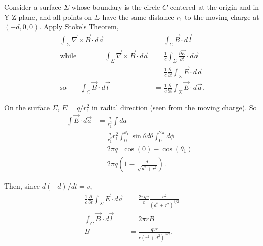 \documentclass[makesolutionspdf]{esg8022pset}
\begin{document}
\begin{solution}
\begin{enumerate}[(a)]
      Consider a surface $\Sigma$ whose boundary is the circle $C$ centered
      at the origin and in Y-Z plane, and all points on $\Sigma$ have the
      same distance $r_1$ to the moving charge at $(-d,0,0)$.  Apply Stoke's
      Theorem,
      \begin{align}
        \int_{\Sigma} \vec{\nabla}\times\vec{B}\cdot d\vec{a} &= \int_C
          \vec{B}\cdot d\vec{l}\\
        \text{while} \qquad\qquad \int_{\Sigma} \vec{\nabla}\times\vec{B}\cdot
        d\vec{a} &= \frac{1}{c}\int_{\Sigma} \frac{\partial \vec{E}}{\partial
          t}\cdot d\vec{a}\nonumber\\
        &= \frac{1}{c}\frac{\partial}{\partial t}\int_{\Sigma} \vec{E}\cdot
          d\vec{a}\\
        \text{so}\qquad \int_C \vec{B}\cdot d\vec{l} &= 
          \frac{1}{c}\frac{\partial}{\partial t}\int_{\Sigma} \vec{E}\cdot
          d\vec{a}.
      \end{align}

      On the surface $\Sigma$, $E=q/r_1^2$ in radial direction (seen from
      the moving charge).  So
      \begin{align}
        \int \vec{E}\cdot d\vec{a} &= \frac{q}{r_1^2}\int da\nonumber\\
        &= \frac{q}{r_1^2}r_1^2\int_{0}^{\theta_1}\sin\theta d\theta
        \int_0^{2\pi}d\phi\nonumber\\
        &= 2\pi q\left[\cos(0) - \cos(\theta_1)\right]\nonumber\\
        &= 2\pi q(1-\frac{d}{\sqrt{d^2+r^2}}).
      \end{align}

      Then, since $d(-d)/dt=v$,
      \begin{align}
        \frac{1}{c}\frac{\partial}{\partial t}\int_{\Sigma} \vec{E}\cdot
        d\vec{a} &= \frac{2\pi qv}{c}\frac{r^2}{(d^2+r^2)^{3/2}}\\
        \int_C \vec{B}\cdot d\vec{l} &= 2\pi rB\\
        B&= \frac{qvr}{c(r^2+d^2)^{3/2}}.
      \end{align}
  \end{enumerate}
\end{solution}

\begin{ForProblems}
  \clearpage
\end{ForProblems}
\end{document}
